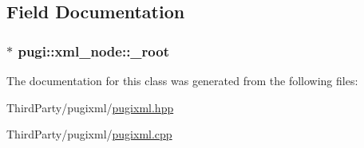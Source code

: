 \subsection{Field Documentation}
\hypertarget{classpugi_1_1xml__node_a45a5b342de1e37a60565f7693f03cc08}{
\subsubsection[{\-\_\-root}]{$\ast$ pugi\-::xml\-\_\-node\-::\-\_\-root\hspace{0.3cm}{\ttfamily [protected]}}}\label{classpugi_1_1xml__node_a45a5b342de1e37a60565f7693f03cc08}


The documentation for this class was generated from the following files\-:\begin{DoxyCompactItemize}
\item 
Third\-Party/pugixml/\hyperlink{pugixml_8hpp}{pugixml.\-hpp}\item 
Third\-Party/pugixml/\hyperlink{pugixml_8cpp}{pugixml.\-cpp}\end{DoxyCompactItemize}
